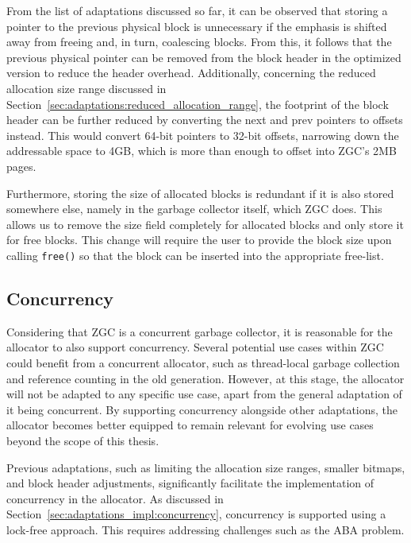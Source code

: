 From the list of adaptations discussed so far, it can be observed that storing a pointer to the previous physical block is unnecessary if the emphasis is shifted away from freeing and, in turn, coalescing blocks. From this, it follows that the previous physical pointer can be removed from the block header in the optimized version to reduce the header overhead. Additionally, concerning the reduced allocation size range discussed in Section~\ref{sec:adaptations:reduced_allocation_range}, the footprint of the block header can be further reduced by converting the next and prev pointers to offsets instead. This would convert 64-bit pointers to 32-bit offsets, narrowing down the addressable space to 4GB, which is more than enough to offset into ZGC's 2MB pages.

Furthermore, storing the size of allocated blocks is redundant if it is also stored somewhere else, namely in the garbage collector itself, which ZGC does. This allows us to remove the size field completely for allocated blocks and only store it for free blocks. This change will require the user to provide the block size upon calling \texttt{free()} so that the block can be inserted into the appropriate free-list.

\subsection{Concurrency}

Considering that ZGC is a concurrent garbage collector, it is reasonable for the allocator to also support concurrency. Several potential use cases within ZGC could benefit from a concurrent allocator, such as thread-local garbage collection and reference counting in the old generation. However, at this stage, the allocator will not be adapted to any specific use case, apart from the general adaptation of it being concurrent. By supporting concurrency alongside other adaptations, the allocator becomes better equipped to remain relevant for evolving use cases beyond the scope of this thesis.

Previous adaptations, such as limiting the allocation size ranges, smaller bitmaps, and block header adjustments, significantly facilitate the implementation of concurrency in the allocator. As discussed in Section~\ref{sec:adaptations_impl:concurrency}, concurrency is supported using a lock-free approach. This requires addressing challenges such as the ABA problem.

